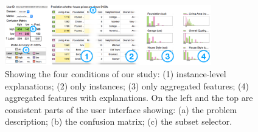 




\begin{figure}
 \centering
 \includegraphics[width=0.8\textwidth]{aggexplain/teaser.pdf}
 \caption[Showing the four study conditions.]{
Showing the four conditions of our study: (1) instance-level explanations; (2) only instances; (3) only aggregated features; (4) aggregated features with explanations.
On the left and the top are consistent parts of the user interface showing: (a) the problem description; (b) the confusion matrix; (c) the subset selector.
 }
 \label{figs:teaser}
\end{figure}




